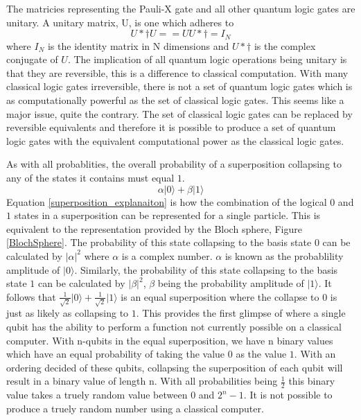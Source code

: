 \documentclass[authoryearcitations]{UoYCSproject}
\begin{document}
The matricies representing the Pauli-X gate and all other quantum logic gates are unitary.
A unitary matrix, U, is one which adheres to
\begin{equation}
U*{\dagger}
U == UU*{\dagger} = I_N
\end{equation}
where $I_N$ is the identity matrix in N dimensions and $U*{\dagger}$ is the complex conjugate of $U$.
The implication of all quantum logic operations being unitary is that they are reversible, this is a difference to classical computation.
With many classical logic gates irreversible, there is not a set of quantum logic gates which is as computationally powerful as the set of classical logic gates.
This seems like a major issue, quite the contrary.
The set of classical logic gates can be replaced by reversible equivalents and therefore it is possible to produce a set of quantum logic gates with the equivalent computational power as the classical logic gates.

As with all probablities, the overall probability of a superposition collapsing to any of the states it contains must equal $1$.
\begin{equation}\label{superposition_explanaiton}
\alpha\vert0\rangle+\beta\vert1\rangle
\end{equation}
Equation \eqref{superposition_explanaiton} is how the combination of the logical $0$ and $1$ states in a superposition can be represented for a single particle.
This is equivalent to the representation provided by the Bloch sphere, Figure \ref{BlochSphere}.
The probability of this state collapsing to the basis state $0$ can be calculated by $\vert\alpha\vert^2$ where $\alpha$ is a complex number.
$\alpha$ is known as the probablility amplitude of $\vert0\rangle$.
Similarly, the probability of this state collapsing to the basis state $1$ can be calculated by $\vert\beta\vert^2$, $\beta$ being the probability amplitude of $\vert1\rangle$.
It follows that $\frac{1}{\sqrt{2}}\vert0\rangle+\frac{1}{\sqrt{2}}\vert1\rangle$ is an equal superposition where the collapse to 0 is just as likely as collapsing to $1$.
This provides the first glimpse of where a single qubit has the ability to perform a function not currently possible on a classical computer.
With n-qubits in the equal superposition, we have n binary values which have an equal probability of taking the value $0$ as the value $1$.
With an ordering decided of these qubits, collapsing the superposition of each qubit will result in a binary value of length n.
With all probabilities being $\frac{1}{2}$ this binary value takes a truely random value between $0$ and $2^n-1$.
It is not possible to produce a truely random number using a classical computer.
\end{document}
